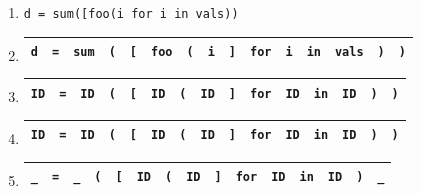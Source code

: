 \documentclass[sigplan,review,anonymous,acmsmall]{acmart}\settopmatter{printfolios=false,printccs=false,printacmref=false}
\begin{document}
\begin{enumerate}
  \item \texttt{d = sum([foo(i\err{]} for i in vals))}
  \item \begin{tabular}{|c|c|c|c|c|c|c|c|c|c|c|c|c|c|c|}
          \hline
          \texttt{d} & \texttt{=} & \texttt{sum} & \texttt{(} & \texttt{[} & \texttt{foo} & \texttt{(} & \texttt{i} & \texttt{]} & \texttt{for} & \texttt{i} & \texttt{in} & \texttt{vals} & \texttt{)} & \texttt{)} \\\hline
  \end{tabular}
  \item \begin{tabular}{|c|c|c|c|c|c|c|c|c|c|c|c|c|c|c|}
          \hline
          \texttt{ID} & \texttt{=} & \texttt{ID} & \texttt{(} & \texttt{[} & \texttt{ID} & \texttt{(} & \texttt{ID} & \texttt{]} & \texttt{for} & \texttt{ID} & \texttt{in} & \texttt{ID} & \texttt{)} & \texttt{)} \\\hline
  \end{tabular}
  \item \begin{tabular}{|||c|||c|||c|||c|||c|||c|||c|||c|||c|||c|||c|||c|||c|||c|||c|||}
          \hline
          \texttt{ID} & \texttt{=} & \texttt{ID} & \texttt{(} & \texttt{[} & \texttt{ID} & \texttt{(} & \texttt{ID} & \texttt{]} & \texttt{for} & \texttt{ID} & \texttt{in} & \texttt{ID} & \texttt{)} & \texttt{)} \\\hline
  \end{tabular}
  \item \begin{tabular}{|||c|||c|||c|||c|||c|||c|||c|||c|||c|||c|||c|||c|||c|||c|||c|||}
          \hline
          \cellcolor{black!15}\texttt{\_} & \texttt{=} & \cellcolor{black!15}\texttt{\_} & \texttt{(} & \texttt{[} & \texttt{ID} & \texttt{(} & \texttt{ID} & \texttt{]} & \texttt{for} & \texttt{ID} & \texttt{in} & \texttt{ID} & \texttt{)} & \cellcolor{black!15}\texttt{\_} \\\hline
  \end{tabular}\\
  \begin{tabular}{|||c|||c|||c|||c|||c|||c|||c|||c|||c|||c|||c|||c|||c|||c|||c|||}

\end{tabular}
\end{enumerate}
\end{document}
